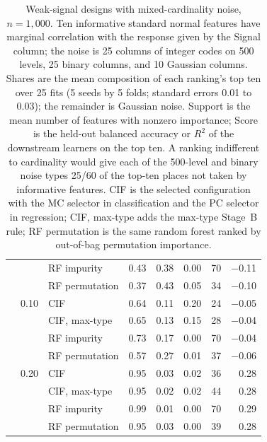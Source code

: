 \begin{table}[!htbp]
\begin{tabular}{@{}lrlrrrrr@{}}
     & & RF impurity & 0.43 & 0.38 & 0.00 & 70 & $-$0.11 \\
     & & RF permutation & 0.37 & 0.43 & 0.05 & 34 & $-$0.10 \\
     & 0.10 & CIF & 0.64 & 0.11 & 0.20 & 24 & $-$0.05 \\
     & & CIF, max-type & 0.65 & 0.13 & 0.15 & 28 & $-$0.04 \\
     & & RF impurity & 0.73 & 0.17 & 0.00 & 70 & $-$0.04 \\
     & & RF permutation & 0.57 & 0.27 & 0.01 & 37 & $-$0.06 \\
     & 0.20 & CIF & 0.95 & 0.03 & 0.02 & 36 & 0.28 \\
     & & CIF, max-type & 0.95 & 0.02 & 0.02 & 44 & 0.28 \\
     & & RF impurity & 0.99 & 0.01 & 0.00 & 70 & 0.29 \\
     & & RF permutation & 0.95 & 0.03 & 0.00 & 39 & 0.28 \\
    \bottomrule
  \end{tabular}
  \caption{Weak-signal designs with mixed-cardinality noise, $n = 1{,}000$.
  Ten informative standard normal features have marginal correlation with the
  response given by the Signal column; the noise is 25 columns of integer codes
  on 500 levels, 25 binary columns, and 10 Gaussian columns. Shares are the mean
  composition of each ranking's top ten over 25 fits (5 seeds by 5 folds;
  standard errors 0.01 to 0.03); the remainder is Gaussian noise. Support is
  the mean number of features with nonzero importance; Score is the held-out
  balanced accuracy or $R^2$ of the downstream learners on the top ten. A
  ranking indifferent to cardinality would give each of the 500-level and binary
  noise types 25/60 of the top-ten places not taken by informative features. CIF is
  the selected configuration with the MC selector in classification and the PC
  selector in regression; CIF, max-type adds the max-type Stage~B rule; RF
  permutation is the same random forest ranked by out-of-bag permutation
  importance.}
  \label{tab:weak-signal-cardinality}
\end{table}
